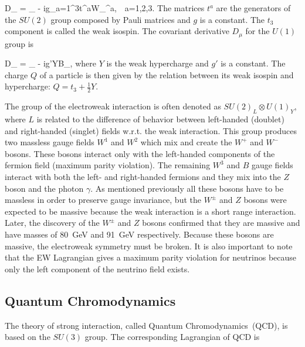 {
   D_{\mu} = \partial_{\mu} - ig\sum_{a=1}^{3}t^{a}W_{\mu}^{a},~~a=1,2,3.
}
The matrices $t^{a}$ are the generators of the $SU(2)$ group composed by Pauli matrices and $g$ is a constant. The $t_{3}$ component is called the weak isospin. The covariant derivative $D_{\mu}$ for the $U(1)$ group is

{
   D_{\mu} = \partial_{\mu} - ig'YB_{\mu},
}
where $Y$ is the weak hypercharge and $g'$ is a constant. The charge $Q$ of a particle is then given by the relation between its weak isospin and hypercharge: $Q= t_{3} + \frac{1}{2}Y$.


The group of the electroweak interaction is often denoted as $SU(2)_{L} \otimes U(1)_{Y}$, where $L$ is related to the difference of behavior between left-handed (doublet) and right-handed (singlet) fields w.r.t. the weak interaction. This group produces two massless gauge fields $W^{1}$ and $W^2$ which mix and create the $W^{+}$ and $W^{-}$ bosons. These bosons interact only with the left-handed components of the fermion field (maximum parity violation). The remaining $W^{3}$ and $B$ gauge fields interact with both the left- and right-handed fermions and they mix into the $Z$ boson and the photon $\gamma$. As mentioned previously all these bosons have to be massless in order to preserve gauge invariance, but the $W^{\pm}$ and $Z$ bosons were expected to be massive because the weak interaction is a short range interaction. Later, the discovery of the $W^{\pm}$ and $Z$ bosons confirmed that they are massive and have masses of 80~GeV and 91~GeV respectively. Because these bosons are massive, the electroweak symmetry must be broken. It is also important to note that the EW Lagrangian gives a maximum parity violation for neutrinos because only the left component of the neutrino field exists.


\subsection{Quantum Chromodynamics}

The theory of strong interaction, called Quantum Chromodynamics~(QCD), is based on the $SU(3)$ group. The corresponding Lagrangian of QCD is


